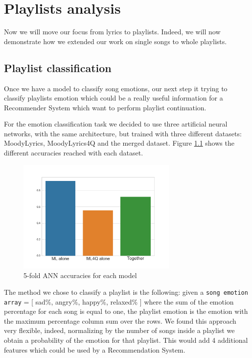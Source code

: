 \chapter{Playlists analysis}

Now we will move our focus from lyrics to playlists. Indeed, we will now demonstrate how we extended our work on single songs to whole playlists.

\section{Playlist classification}

Once we have a model to classify song emotions, our next step it trying to classify playlists emotion which could be a really useful information for a Recommender System which want to perform playlist continuation.

For the emotion classification task we decided to use three artificial neural networks, with the same architecture, but trained with three different datasets: MoodyLyrics, MoodyLyrics4Q and the merged dataset. Figure \ref{fig:annacc} shows the different accuracies reached with each dataset. 

\begin{figure}[H]
\centering
\includegraphics[width=0.7\textwidth]{./chapters/chapter5/images/ANN_accuracies.png}
\caption{5-fold ANN accuracies for each model}
\label{fig:annacc}
\end{figure}

The method we chose to classify a playlist is the following: given a \texttt{song emotion array} = [ sad\%, angry\%, happy\%, relaxed\% ] where the sum of the emotion percentage for each song is equal to one, the playlist emotion is the emotion with the maximum percentage column sum over the rows. We found this approach very flexible, indeed, normalizing by the number of songs inside a playlist we obtain a probability of the emotion for that playlist. This would add 4 additional features which could be used by a Recommendation System.

